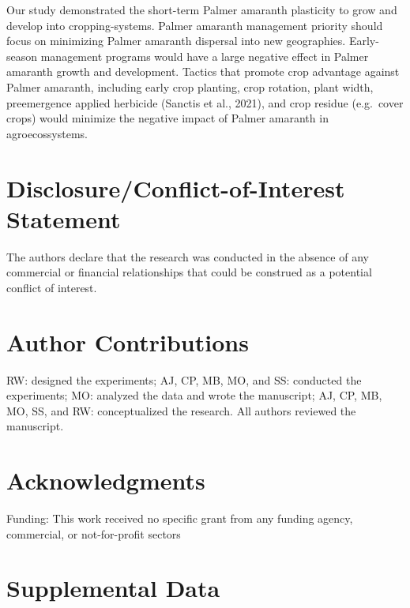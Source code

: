 \documentclass[utf8]{frontiersSCNS}
\begin{document}
Our study demonstrated the short-term Palmer amaranth plasticity to grow
and develop into cropping-systems. Palmer amaranth management priority
should focus on minimizing Palmer amaranth dispersal into new
geographies. Early-season management programs would have a large
negative effect in Palmer amaranth growth and development. Tactics that
promote crop advantage against Palmer amaranth, including early crop
planting, crop rotation, plant width, preemergence applied herbicide
(Sanctis et al., 2021), and crop residue (e.g.~cover crops) would
minimize the negative impact of Palmer amaranth in agroecossystems.

\hypertarget{disclosureconflict-of-interest-statement}{%
\section*{Disclosure/Conflict-of-Interest
Statement}\label{disclosureconflict-of-interest-statement}}

The authors declare that the research was conducted in the absence of
any commercial or financial relationships that could be construed as a
potential conflict of interest.

\hypertarget{author-contributions}{%
\section*{Author Contributions}\label{author-contributions}}

RW: designed the experiments; AJ, CP, MB, MO, and SS: conducted the
experiments; MO: analyzed the data and wrote the manuscript; AJ, CP, MB,
MO, SS, and RW: conceptualized the research. All authors reviewed the
manuscript.

\hypertarget{acknowledgments}{%
\section*{Acknowledgments}\label{acknowledgments}}

Funding: This work received no specific grant from any funding agency,
commercial, or not-for-profit sectors

\hypertarget{supplemental-data}{%
\section{Supplemental Data}\label{supplemental-data}}
\end{document}
